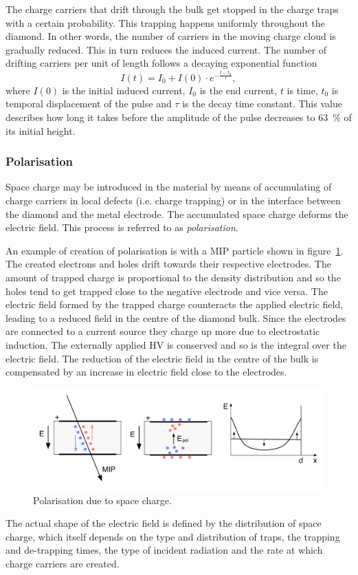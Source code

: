 The charge carriers that drift through the bulk get stopped in the charge traps with a certain probability. This trapping happens uniformly throughout the diamond. In other words, the number of carriers in the moving charge cloud is gradually reduced. This in turn reduces the induced current. The number of drifting carriers per unit of length follows a decaying exponential function
\begin{equation}
\label{eq:decayexp}
I(t)= I_0 + I(0) \cdot e^{-\frac{t-t_0}{\tau} },
\end{equation}
where $I(0)$ is the initial induced current, $I_0$ is the end current, $t$ is time, $t_0$ is temporal displacement of the pulse and $\tau$ is the decay time constant. This value describes how long it takes before the amplitude of the pulse decreases to 63~\% of its initial height.

\subsubsection{Polarisation}
Space charge may be introduced in the material by means of accumulating of charge carriers in local defects (i.e. charge trapping) or in the interface between the diamond and the metal electrode. The accumulated space charge deforms the electric field. This process is referred to as \emph{polarisation}. 

An example of creation of polarisation is with a MIP particle shown in figure~\ref{fig:polar1}. The created electrons and holes drift towards their respective electrodes. The amount of trapped charge is proportional to the density distribution and so the holes tend to get trapped close to the negative electrode and vice versa. The electric field formed by the trapped charge counteracts the applied electric field, leading to a reduced field in the centre of the diamond bulk. Since the electrodes are connected to a current source they charge up more due to electrostatic induction. The externally applied HV is conserved and so is the integral over the electric field. The reduction of the electric field in the centre of the bulk is compensated by an increase in electric field close to the electrodes. 
\begin{figure}[!t]
\begin{center}
\includegraphics[width=0.9\linewidth]{02_pulse_formation/pics/plots/polar1}
\caption{Polarisation due to space charge.}
\label{fig:polar1}
\end{center}
\end{figure}
The actual shape of the electric field is defined by the distribution of space charge, which itself depends on the type and distribution of traps, the trapping and de-trapping times, the type of incident radiation and the rate at which charge carriers are created.

